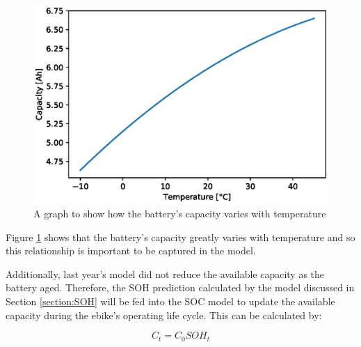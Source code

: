 \documentclass[a4paper, 10pt]{article}
\numberwithin{equation}{section}
\begin{document}
\begin{figure}[H]
    \centering
    \includegraphics[width=0.5\linewidth]{images/capacity_temp.eps}
    \caption{A graph to show how the battery's capacity varies with temperature}
    \label{fig:capacity_temp}
\end{figure}

Figure \ref{fig:capacity_temp} shows that the battery's capacity greatly varies with temperature and so this relationship is important to be captured in the model.

Additionally, last year's model did not reduce the available capacity as the battery aged. Therefore, the SOH prediction calculated by the model discussed in Section \ref{section:SOH} will be fed into the SOC model to update the available capacity during the ebike's operating life cycle. This can be calculated by:

\begin{equation}
    C_{t} = C_{0}SOH_{t}
\end{equation}
\end{document}
